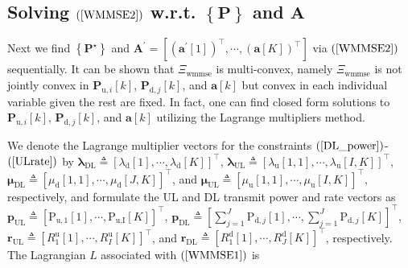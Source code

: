 \documentclass[9pt,journal]{IEEEtran}
\newcommand{\paren}[1]{\left({#1}\right)}
\newcommand{\bracket}[1]{{\left [{#1}\right ]}}
\newcommand{\braces}[1]{{\left\{ {#1}\right\}}}
\newcommand{\rr}{_\mathrm{r}}
\newcommand{\B}{\textrm{B}}
\newcommand{\PiB}{\mathbf{P}_{\textrm{u},i}\bracket{k}}
\newcommand{\PBj}{\mathbf{P}_{\textrm{d},j}\bracket{k}}
\begin{document}
\subsection{Solving $\paren{\ref{WMMSE2}}$ w.r.t. $\braces{\mathbf{P}}$ and $\mathbf{A}$}
Next we find $\braces{\mathbf{P}^\star}$ and 
$\mathbf{A}^\prime=\bracket{\paren{\mathbf{a}^\prime\bracket{1}}^\top,\cdots,\paren{\mathbf{a}\bracket{\mathit{K}}}^\top}$  via $\paren{\ref{WMMSE2}}$ sequentially. It can be shown that $\Xi_{\text{wmmse}}$ is multi-convex, namely $\Xi_{\text{wmmse}}$ is not jointly convex in $\PiB$, $\PBj$, and $\mathbf{a}\bracket{k}$ but convex in each individual variable given the rest are fixed\cite{BlockCoordinate}. In fact, one can find closed form solutions to $\PiB$, $\PBj$, and $\mathbf{a}\bracket{k}$ utilizing the Lagrange multipliers method. 

We denote the Lagrange multiplier vectors for the constraints $\paren{\mathrm{\ref{DL_power}}}$-$\paren{\mathrm{\ref{ULrate}}}$ by $\boldsymbol{\lambda}_{\text{DL}}\triangleq\bracket{\lambda_\textrm{d}\bracket{1},\cdots,\lambda_\textrm{d}\bracket{\mathrm{\mathit{K}}}}^\top$, $\boldsymbol{\lambda}_{\text{UL}}\triangleq\bracket{\lambda_\textrm{u}\bracket{1,1},\cdots,\lambda_\textrm{u}\bracket{\mathit{I,K}}}^\top$, $\boldsymbol{\mu}_{\text{DL}}\triangleq\bracket{\mu_\textrm{d}\bracket{1,1},\cdots,\mu_\textrm{d}\bracket{\mathit{J,K}}}^\top$, and $\boldsymbol{\mu}_{\text{UL}}\triangleq\bracket{\mu_\textrm{u}\bracket{1,1},\cdots,\mu_\textrm{u}\bracket{\mathit{I,K}}}^\top$, respectively, and formulate the UL and DL transmit power and rate vectors as $\mathbf{p}_{\textrm{UL}}\triangleq\bracket{\mathrm{P}_{\textrm{u},1}\bracket{1},\cdots,\mathrm{P}_{\textrm{u,I}}\bracket{\mathit{K}}}^\top$, $\mathbf{p}_{\textrm{DL}}\triangleq\bracket{\sum_{j=1}^\mathit{J}\mathrm{P}_{\textrm{d},j}\bracket{1},\cdots,\sum_{j=1}^\mathit{J}\mathrm{P}_{\textrm{d},j}\bracket{\mathit{K}}}^\top$, $\mathbf{r}_{\textrm{UL}}\triangleq\bracket{\mathit{R}^\textrm{u}_{1}\bracket{1},\cdots,\mathit{R}^\textrm{u}_{\mathit{I}}\bracket{\mathit{K}}}^\top$, and $\mathbf{r}_{\textrm{DL}}\triangleq\bracket{\mathit{R}^\textrm{d}_{1}\bracket{1},\cdots,\mathit{R}^\textrm{d}_{\mathit{J}}\bracket{\mathit{K}}}^\top$, respectively. The Lagrangian $L$ associated with $\paren{\ref{WMMSE1}}$ is\par\noindent\small
\end{document}
